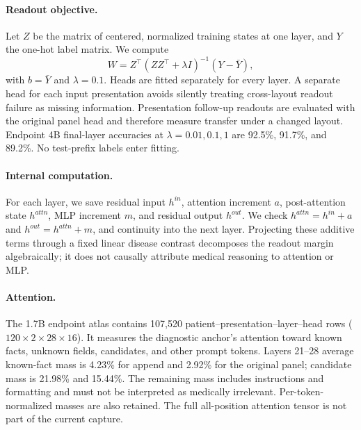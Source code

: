 \paragraph{Readout objective.} Let $Z$ be the matrix of centered, normalized training states at one layer, and $Y$ the one-hot label matrix. We compute
\begin{equation}
 W=Z^\top(ZZ^\top+\lambda I)^{-1}(Y-\bar Y),
\end{equation}
with $b=\bar Y$ and $\lambda=0.1$. Heads are fitted separately for every layer. A separate head for each input presentation avoids silently treating cross-layout readout failure as missing information. Presentation follow-up readouts are evaluated with the original panel head and therefore measure transfer under a changed layout. Endpoint 4B final-layer accuracies at $\lambda=0.01,0.1,1$ are 92.5\%, 91.7\%, and 89.2\%. No test-prefix labels enter fitting.

\paragraph{Internal computation.} For each layer, we save residual input $h^{in}$, attention increment $a$, post-attention state $h^{attn}$, MLP increment $m$, and residual output $h^{out}$. We check $h^{attn}=h^{in}+a$ and $h^{out}=h^{attn}+m$, and continuity into the next layer. Projecting these additive terms through a fixed linear disease contrast decomposes the readout margin algebraically; it does not causally attribute medical reasoning to attention or MLP.

\paragraph{Attention.} The 1.7B endpoint atlas contains 107,520 patient--presentation--layer--head rows ($120\times2\times28\times16$). It measures the diagnostic anchor's attention toward known facts, unknown fields, candidates, and other prompt tokens. Layers 21--28 average known-fact mass is 4.23\% for append and 2.92\% for the original panel; candidate mass is 21.98\% and 15.44\%. The remaining mass includes instructions and formatting and must not be interpreted as medically irrelevant. Per-token-normalized masses are also retained. The full all-position attention tensor is not part of the current capture.

